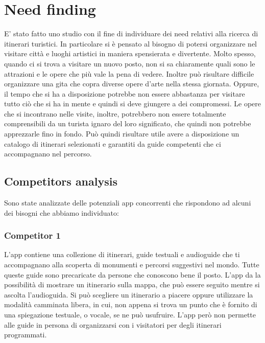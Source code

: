 

\section*{Need finding}

E' stato fatto uno studio con il fine di individuare dei need relativi alla ricerca
di itinerari turistici. In particolare si è pensato al bisogno di potersi organizzare nel visitare città e
luoghi artistici in maniera spensierata e divertente. Molto spesso, quando ci si trova a 
visitare un nuovo posto, non si sa chiaramente quali sono le attrazioni e le opere che più
vale la pena di vedere. Inoltre può risultare difficile organizzare una gita che copra
diverse opere d'arte nella stessa giornata. Oppure, il tempo che si ha a disposizione potrebbe non
essere abbastanza per visitare tutto ciò che si ha in mente e quindi si deve giungere a dei compromessi.
Le opere che si incontrano nelle visite, inoltre, potrebbero non essere totalmente comprensibili
da un turista ignaro del loro significato, che quindi non potrebbe apprezzarle fino in fondo.
Può quindi risultare utile avere a disposizione un catalogo di itinerari selezionati e
garantiti da guide competenti che ci accompagnano nel percorso.

\subsection*{Competitors analysis}

Sono state analizzate delle potenziali app concorrenti che rispondono ad alcuni dei bisogni
che abbiamo individuato:

\subsubsection*{Competitor 1}
L'app contiene una collezione di itinerari, guide testuali e audioguide che ti accompagnano
alla scoperta di monumenti e percorsi suggestivi nel mondo.
Tutte queste guide sono precaricate da persone che conoscono bene il posto.
L’app da la possibilità di mostrare un itinerario sulla mappa, che può essere seguito
mentre si ascolta l’audioguida.
Si può scegliere un itinerario a piacere oppure utilizzare la modalità camminata libera,
in cui, non appena si trova un punto che è fornito di una spiegazione testuale, o vocale,
se ne può usufruire.
L’app però non permette alle guide in persona di organizzarsi con i visitatori per degli
itinerari programmati.

